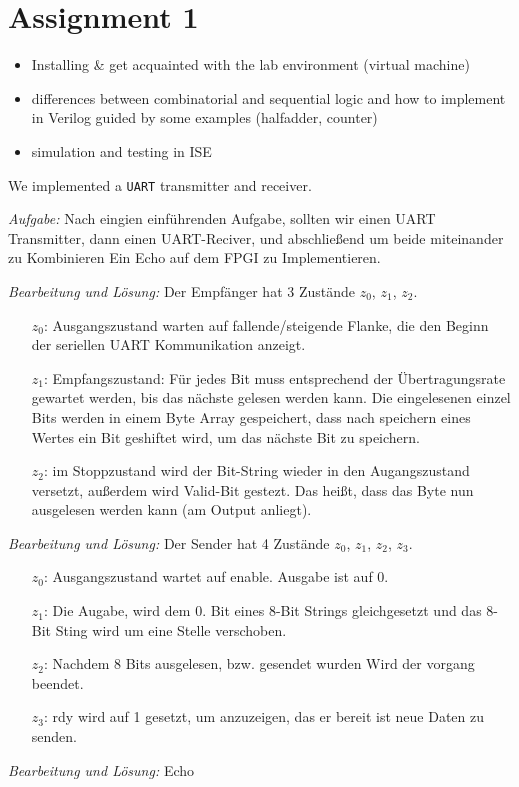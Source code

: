 \section*{Assignment 1}

\begin{itemize}
    \item Installing \& get acquainted with the lab environment (virtual machine)
    \item differences between combinatorial and sequential logic and how to implement in Verilog guided by some examples (halfadder, counter)
    \item simulation and testing in ISE
\end{itemize}

We implemented a \texttt{UART} transmitter and receiver.

\emph{Aufgabe: }Nach eingien einführenden Aufgabe, sollten wir einen UART Transmitter, dann einen UART-Reciver, und abschließend um beide miteinander zu Kombinieren Ein Echo auf dem FPGI zu Implementieren.


\emph{Bearbeitung und Lösung: }Der Empfänger hat 3 Zustände $z_0$, $z_1$, $z_2$.\begin{itemize}


\item[$z_0$:] Ausgangszustand warten auf fallende/steigende Flanke, die den Beginn der seriellen UART Kommunikation anzeigt.
\item[$z_1$:] Empfangszustand: Für jedes Bit muss entsprechend der Übertragungsrate gewartet werden, bis das nächste gelesen werden kann. Die eingelesenen einzel Bits werden in einem Byte Array gespeichert, dass nach speichern eines Wertes ein Bit geshiftet wird, um das nächste Bit zu speichern. 
\item[$z_2$:] im Stoppzustand wird der Bit-String wieder in den Augangszustand versetzt, außerdem wird Valid-Bit gestezt. Das heißt, dass das Byte nun ausgelesen werden kann (am Output anliegt). 
\end{itemize}

\emph{Bearbeitung und Lösung: }Der Sender hat 4 Zustände $z_0$, $z_1$, $z_2$, $z_3$.\begin{itemize}


\item[$z_0$:] Ausgangszustand wartet auf enable. Ausgabe ist auf 0.
\item[$z_1$:] Die Augabe, wird dem 0. Bit eines 8-Bit Strings gleichgesetzt und das 8-Bit Sting wird um eine Stelle verschoben.
\item[$z_2$:] Nachdem 8 Bits ausgelesen, bzw. gesendet wurden Wird der vorgang beendet.
\item[$z_3$:] rdy wird auf 1 gesetzt, um anzuzeigen, das er bereit ist neue Daten zu senden.  

\end{itemize}

\emph{Bearbeitung und Lösung: } Echo 
